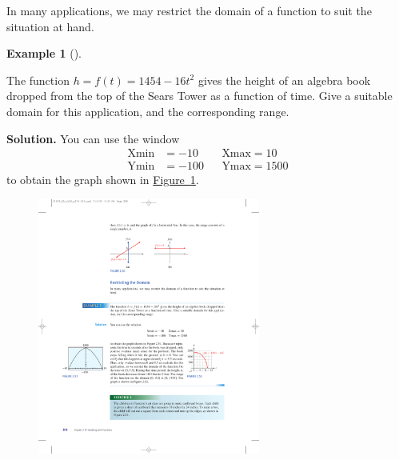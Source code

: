 \documentclass[10pt,]{book}
\theoremstyle{plain}
\theoremstyle{definition}
\theoremstyle{definition}
\theoremstyle{definition}
\newtheorem{example}[theorem]{Example}
\theoremstyle{definition}
\theoremstyle{definition}
\numberwithin{equation}{section}
\newcommand{\amp}{ & }
\begin{document}
    In many applications, we may restrict the domain of a function to suit the situation at hand.
%
\begin{example}[]\label{example-falling-algebra-book}

    The function \(h = f (t) = 1454 − 16t^2\) gives the height of an algebra book dropped from the top of the Sears Tower as a function of time. Give a suitable domain for this application, and the corresponding range.
%
\par\medskip\noindent%
\textbf{Solution.}\quad 
    You can use the window
        \begin{align}
        \text{Xmin} \amp = −10 \amp\amp \text{Xmax} = 10\\
        \text{Ymin} \amp = −100 \amp\amp \text{Ymax} = 1500
        \end{align}
    to obtain the graph shown in \hyperref[fig-GC-falling-algebra-book]{Figure~\ref{fig-GC-falling-algebra-book}}. 
\leavevmode%
\begin{figure}
\centering
\includegraphics[width=0.65\textwidth,]{images/fig-GC-falling-algebra-book.pdf}\caption{\label{fig-GC-falling-algebra-book}}
\end{figure}



\end{example}
\end{document}
